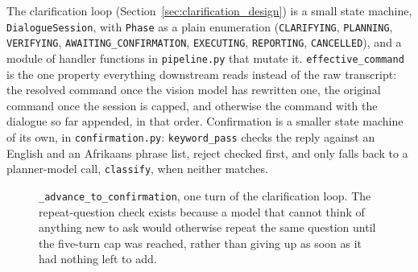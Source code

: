 \label{sec:orchestration}

\label{sec:clarification_impl}

The clarification loop (Section~\ref{sec:clarification_design}) is a small
state machine, \texttt{DialogueSession}, with \texttt{Phase} as a plain
enumeration (\texttt{CLARIFYING}, \texttt{PLANNING}, \texttt{VERIFYING},
\texttt{AWAITING\_CONFIRMATION}, \texttt{EXECUTING}, \texttt{REPORTING},
\texttt{CANCELLED}), and a module of handler functions in
\texttt{pipeline.py} that mutate it. \texttt{effective\_command} is the one
property everything downstream reads instead of the raw transcript: the
resolved command once the vision model has rewritten one, the original
command once the session is capped, and otherwise the command with the
dialogue so far appended, in that order. Confirmation is a smaller state
machine of its own, in \texttt{confirmation.py}: \texttt{keyword\_pass}
checks the reply against an English and an Afrikaans phrase list, reject
checked first, and only falls back to a planner-model call,
\texttt{classify}, when neither matches.

\begin{figure}[htbp]
  \centering
  \caption{\texttt{\_advance\_to\_confirmation}, one turn of the clarification loop. The repeat-question check exists because a model that cannot think of anything new to ask would otherwise repeat the same question until the five-turn cap was reached, rather than giving up as soon as it had nothing left to add.}
  \label{fig:flow-clarify}
\end{figure}

